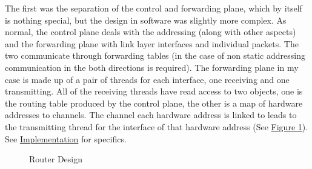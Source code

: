 \documentclass[12pt,a4paper,twoside,openright]{report}
\begin{document}
\bigskip

The first was the separation of the control and forwarding plane, which by itself is nothing special, but the design in software was slightly more complex.  As normal, the control plane deals with the addressing (along with other aspects) and the forwarding plane with link layer interfaces and individual packets.  The two communicate through forwarding tables (in the case of non static addressing communication in the both directions is required). The forwarding plane in my case is made up of a pair of threads for each interface, one receiving and one transmitting. All of the receiving threads have read access to two objects, one is the routing table produced by the control plane, the other is a map of hardware addresses to channels.  The channel each hardware address is linked to leads to the transmitting thread for the interface of that hardware address (See \hyperref[fig::router_design]{Figure }\ref{fig::router_design}). See \hyperref[chap::implementation]{Implementation} for specifics.

\begin{figure}
\centering
{}
\caption{Router Design}
\label{fig::router_design}
\end{figure}
\end{document}
